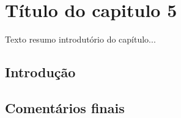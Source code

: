 \graphicspath{{figuras/}}

\chapter{Título do capitulo 5}
\label{cap5}

Texto resumo introdutório do capítulo...

\section{Introdução}


\section{Comentários finais}